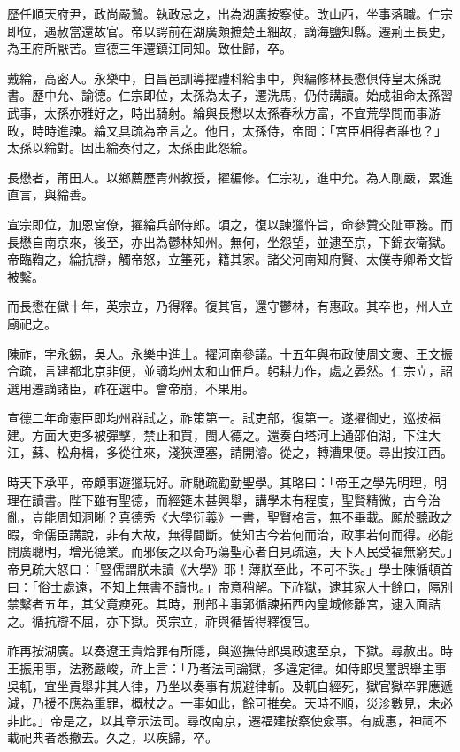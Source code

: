 \begin{pinyinscope}
歷任順天府尹，政尚嚴鷙。執政忌之，出為湖廣按察使。改山西，坐事落職。仁宗即位，遇赦當還故官。帝以諤前在湖廣頗摭楚王細故，謫海鹽知縣。遷荊王長史，為王府所厭苦。宣德三年遷鎮江同知。致仕歸，卒。

戴綸，高密人。永樂中，自昌邑訓導擢禮科給事中，與編修林長懋俱侍皇太孫說書。歷中允、諭德。仁宗即位，太孫為太子，遷洗馬，仍侍講讀。始成祖命太孫習武事，太孫亦雅好之，時出騎射。綸與長懋以太孫春秋方富，不宜荒學問而事游畋，時時進諫。綸又具疏為帝言之。他日，太孫侍，帝問：「宮臣相得者誰也？」太孫以綸對。因出綸奏付之，太孫由此怨綸。

長懋者，莆田人。以鄉薦歷青州教授，擢編修。仁宗初，進中允。為人剛嚴，累進直言，與綸善。

宣宗即位，加恩宮僚，擢綸兵部侍郎。頃之，復以諫獵忤旨，命參贊交阯軍務。而長懋自南京來，後至，亦出為鬱林知州。無何，坐怨望，並逮至京，下錦衣衛獄。帝臨鞫之，綸抗辯，觸帝怒，立箠死，籍其家。諸父河南知府賢、太僕寺卿希文皆被繫。

而長懋在獄十年，英宗立，乃得釋。復其官，還守鬱林，有惠政。其卒也，州人立廟祀之。

陳祚，字永錫，吳人。永樂中進士。擢河南參議。十五年與布政使周文褒、王文振合疏，言建都北京非便，並謫均州太和山佃戶。躬耕力作，處之晏然。仁宗立，詔選用遷謫諸臣，祚在選中。會帝崩，不果用。

宣德二年命憲臣即均州群試之，祚策第一。試吏部，復第一。遂擢御史，巡按福建。方面大吏多被彈擊，禁止和買，閩人德之。還奏白塔河上通邵伯湖，下注大江，蘇、松舟楫，多從往來，淺狹湮塞，請開濬。從之，轉漕果便。尋出按江西。

時天下承平，帝頗事遊獵玩好。祚馳疏勸勤聖學。其略曰：「帝王之學先明理，明理在讀書。陛下雖有聖德，而經筵未甚興舉，講學未有程度，聖賢精微，古今治亂，豈能周知洞晰？真德秀《大學衍義》一書，聖賢格言，無不畢載。願於聽政之暇，命儒臣講說，非有大故，無得間斷。使知古今若何而治，政事若何而得。必能開廣聰明，增光德業。而邪佞之以奇巧蕩聖心者自見疏遠，天下人民受福無窮矣。」帝見疏大怒曰：「豎儒謂朕未讀《大學》耶！薄朕至此，不可不誅。」學士陳循頓首曰：「俗士處遠，不知上無書不讀也。」帝意稍解。下祚獄，逮其家人十餘口，隔別禁繫者五年，其父竟瘐死。其時，刑部主事郭循諫拓西內皇城修離宮，逮入面詰之。循抗辯不屈，亦下獄。英宗立，祚與循皆得釋復官。

祚再按湖廣。以奏遼王貴烚罪有所隱，與巡撫侍郎吳政逮至京，下獄。尋赦出。時王振用事，法務嚴峻，祚上言：「乃者法司論獄，多違定律。如侍郎吳璽誤舉主事吳軏，宜坐貢舉非其人律，乃坐以奏事有規避律斬。及軏自經死，獄官獄卒罪應遞減，乃援不應為重罪，概杖之。一事如此，餘可推矣。天時不順，災沴數見，未必非此。」帝是之，以其章示法司。尋改南京，遷福建按察使僉事。有威惠，神祠不載祀典者悉撤去。久之，以疾歸，卒。


\end{pinyinscope}
